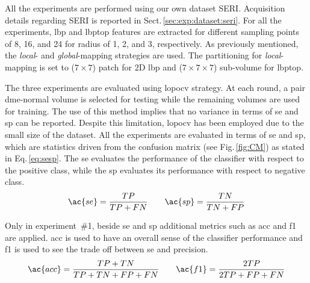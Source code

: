 All the experiments are performed using our own dataset SERI.
Acquisition details regarding SERI is reported in Sect.\,\ref{sec:exp:dataset:seri}.
For all the experiments, \ac{lbp} and \ac{lbptop} features are extracted for different sampling points of 8, 16, and 24 for radius of 1, 2, and 3, respectively.
As previously mentioned, the \emph{local}- and \emph{global}-mapping strategies are used.
The partitioning for \emph{local}-mapping is set to ($7 \times 7$) patch for 2D \ac{lbp} and ($ 7 \times 7 \times 7$) sub-volume for \ac{lbptop}.

The three experiments are evaluated using \ac{lopocv} strategy.
At each round, a pair \ac{dme}-normal volume is selected for testing while the remaining volumes are used for training.
The use of this method implies that no variance in terms of \acf{se} and \acf{sp} can be reported.
Despite this limitation, \ac{lopocv} has been employed due to the small size of the dataset.
All the experiments are evaluated in terms of \ac{se} and \ac{sp}, which are statistics driven from the confusion matrix (see Fig.\,\ref{fig:CM}) as stated in Eq.\,\ref{eq:sesp}.
The \ac{se} evaluates the performance of the classifier with respect to the positive class, while the \ac{sp} evaluates its performance with respect to negative class.
\begin{align}
 \ac{se}  = \frac{TP}{TP+FN} \qquad \ac{sp} = \frac{TN}{TN+FP}
 \label{eq:sesp}
\end{align}

Only in experiment~\#1, beside \ac{se} and \ac{sp} additional metrics such as \ac{acc} and \ac{f1} are applied. 
\ac{acc} is used to have an overall sense of the classifier performance and \ac{f1} is used to see the trade off between \ac{se} and precision.
\begin{align}
\ac{acc} = \frac{TP+TN}{TP+TN+FP+FN} \qquad \ac{f1} = \frac{2TP}{2TP +FP+FN}
\label{eq:accf1}
\end{align}

